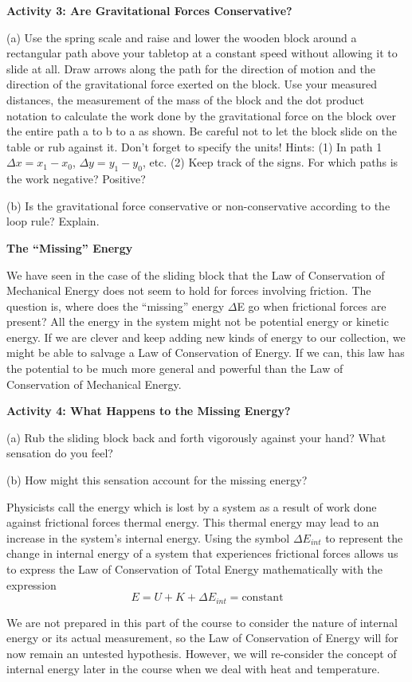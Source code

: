 \textbf{Activity 3: Are Gravitational Forces Conservative? }

(a) Use the spring scale and raise and lower the wooden block around a rectangular
path above your tabletop at a constant speed without allowing it to slide at
all. Draw arrows along the path for the direction of motion and the direction
of the gravitational force exerted on the block. Use your measured distances,
the measurement of the mass of the block and the dot product notation to calculate
the work done by the gravitational force on the block over the entire path a
to b to a as shown. Be careful not to let the block slide on the table or rub
against it. Don't forget to specify the units! Hints: (1) In path 1 
\( \Delta  x
= x_{1}  - x_{0} \), \( \Delta  y = y_{1}  - y_{0} \),
etc. (2) Keep track of the signs. For which paths is the work negative? Positive?
\vspace{40mm}

(b) Is the gravitational force conservative or non-conservative according to
the loop rule? Explain.
\vspace{20mm}

\textbf{The ``Missing'' Energy} 

We have seen in the case of the sliding block that the Law of Conservation of
Mechanical Energy does not seem to hold for forces involving friction. The question
is, where does the ``missing'' energy \( \Delta  \)E go when
frictional forces are present? All the energy in the system might not be potential
energy or kinetic energy. If we are clever and keep adding new kinds of energy
to our collection, we might be able to salvage a Law of Conservation of Energy.
If we can, this law has the potential to be much more general and powerful than
the Law of Conservation of Mechanical Energy.

\textbf{Activity 4: What Happens to the Missing Energy?} 

(a) Rub the sliding block back and forth vigorously against your hand? What
sensation do you feel?
\vspace{10mm}

(b) How might this sensation account for the missing energy?
\vspace{20mm}

Physicists call the energy which is lost by a system as a result of work done
against frictional forces thermal energy. This thermal energy may lead to an
increase in the system's internal energy. Using the symbol \( 
\Delta E_{int} \) to
represent the change in internal energy of a system that experiences frictional
forces allows us to express the Law of Conservation of Total Energy mathematically
with the expression
\[
E=U+K+\Delta E_{int}=\mbox{constant}\]


We are not prepared in this part of the course to consider the nature of internal
energy or its actual measurement, so the Law of Conservation of Energy will
for now remain an untested hypothesis. However, we will re-consider the concept
of internal energy later in the course when we deal with heat and temperature.

